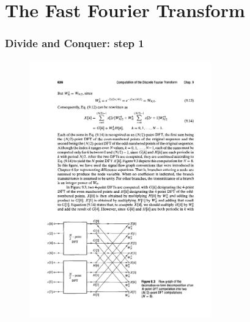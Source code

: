 \section{The Fast Fourier Transform}

\begin{frame}
\frametitle{Divide and Conquer: step 1}
\begin{figure}
  \centering
  \includegraphics[width=0.7\textwidth]{FFT81}\\
\end{figure}

\end{frame}

